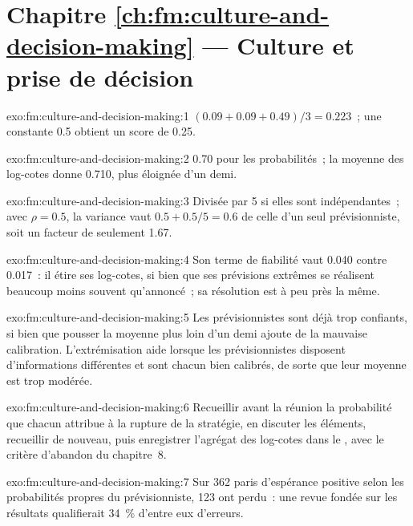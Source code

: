 \section*{Chapitre \ref{ch:fm:culture-and-decision-making} --- Culture et prise de décision}

\begin{solution}{exo:fm:culture-and-decision-making:1}
$(0.09+0.09+0.49)/3=0.223$~; une constante 0.5 obtient un score de 0.25.
\end{solution}

\begin{solution}{exo:fm:culture-and-decision-making:2}
0.70 pour les probabilités~; la moyenne des log-cotes donne 0.710, plus éloignée d'un demi.
\end{solution}

\begin{solution}{exo:fm:culture-and-decision-making:3}
Divisée par 5 si elles sont indépendantes~; avec $\rho=0.5$, la variance vaut $0.5+0.5/5=0.6$ de celle d'un seul prévisionniste, soit un facteur de seulement 1.67.
\end{solution}

\begin{solution}{exo:fm:culture-and-decision-making:4}
Son terme de fiabilité vaut 0.040 contre 0.017~: il étire ses log-cotes, si bien que ses prévisions extrêmes se réalisent beaucoup moins souvent qu'annoncé~; sa résolution
est à peu près la même.
\end{solution}

\begin{solution}{exo:fm:culture-and-decision-making:5}
Les prévisionnistes sont déjà trop confiants, si bien que pousser la moyenne plus loin d'un demi ajoute de la mauvaise calibration. L'extrémisation aide lorsque les prévisionnistes
disposent d'informations différentes et sont chacun bien calibrés, de sorte que leur moyenne est trop modérée.
\end{solution}

\begin{solution}{exo:fm:culture-and-decision-making:6}
Recueillir avant la réunion la probabilité que chacun attribue à la rupture de la stratégie, en discuter les éléments, recueillir de nouveau, puis enregistrer
l'agrégat des log-cotes dans le , avec le critère d'abandon du chapitre~8.
\end{solution}

\begin{solution}{exo:fm:culture-and-decision-making:7}
Sur 362 paris d'espérance positive selon les probabilités propres du prévisionniste, 123 ont perdu~: une revue fondée sur les résultats qualifierait 34~\% d'entre eux d'erreurs.
\end{solution}

